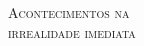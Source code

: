




\begingroup\thispagestyle{empty}\vspace*{.05\textheight} 


              \formular
              \LARGE 
              \noindent
              \textsc{Acontecimentos na\\irrealidade imediata}
              \smallskip
                      
              \large
              \noindent\textit{}
              \normalsize 
              \vspace{2em}
                    
\endgroup
\vfill
\pagebreak